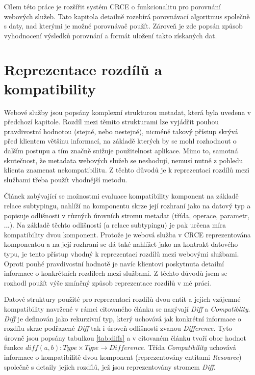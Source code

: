 \documentclass[czech,DP]{thesiskiv}
\begin{document}
Cílem této práce je rozšířit systém CRCE o funkcionalitu pro porovnání webových služeb. Tato kapitola detailně rozebírá porovnávací algoritmus společně s daty, nad kterými je možné porovnávač použít. Zároveň je zde popsán způsob vyhodnocení výsledků porovnání a formát uložení takto získaných dat.

\section{Reprezentace rozdílů a kompatibility}
\label{sec:diff-info}
Webové služby jsou popsány komplexní strukturou metadat, která byla uvedena v předchozí kapitole. Rozdíl mezi těmito strukturami lze vyjádřit pouhou pravdivostní hodnotou (stejné, nebo nestejné), nicméně takový přístup skrývá před klientem většinu informací, na základě kterých by se mohl rozhodnout o dalším postupu a tím značně snižuje použitelnost aplikace. Mimo to, samotná skutečnost, že metadata webových služeb se neshodují, nemusí nutně z pohledu klienta znamenat nekompatibilitu. Z těchto důvodů je k reprezentaci rozdílů mezi službami třeba použít vhodnější metodu.

Článek \cite{brada2006diff} zabývající se možnostmi evaluace kompatibility komponent na základě relace subtypingu, nahlíží na komponentu skrze její rozhraní jako na datový typ a popisuje odlišnosti v různých úrovních stromu metadat (třída, operace, parametr, ...). Na základě těchto odlišností (a relace subtypingu) je pak určena míra kompatibility dvou komponent. Protože je webová služba v CRCE reprezentována komponentou a na její rozhraní se dá také nahlížet jako na kontrakt datového typu, je tento přístup vhodný k reprezentaci rozdílů mezi webovými službami. Oproti pouhé pravdivostní hodnotě je navíc klientovi poskytnuta detailní informace o konkrétních rozdílech mezi službami. Z těchto důvodů jsem se rozhodl použít výše zmíněný způsob reprezentace rozdílů v mé práci. 

Datové struktury použité pro reprezentaci rozdílů dvou entit a jejich vzájemné kompatibility navržené v rámci citovaného článku se nazývají \textit{Diff} a \textit{Compatiblity}. \textit{Diff} je definován jako rekurzivní typ, který uchovává jak konkrétní informace o rozdílu skrze podřazené \textit{Diff} tak i úroveň odlišnosti zvanou \textit{Difference}. Tyto úrovně jsou popsány tabulkou \ref{tab:diffs} a v citovaném článku tvoří obor hodnot funkce $diff(a,b): Type \times Type \rightarrow Difference$. Třída \textit{Compatibility} uchovává informace o kompatibilitě dvou komponent (reprezentovány entitami \textit{Resource}) společně s detaily jejich rozdílů, jež jsou reprezentovány stromem \textit{Diff}.
\end{document}
